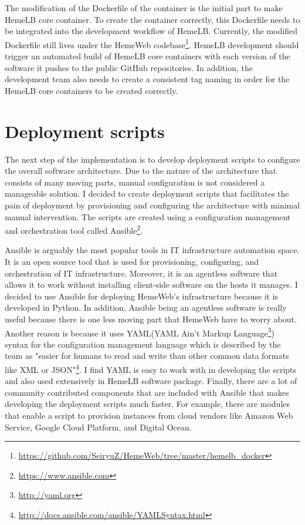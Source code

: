 The modification of the Dockerfile of the container is the initial part to make HemeLB core container. To create the container correctly, this Dockerfile needs to be integrated into the development workflow of HemeLB. Currently, the modified Dockerfile still lives under the HemeWeb codebase\footnote{\url{https://github.com/SeiryuZ/HemeWeb/tree/master/hemelb_docker}}. HemeLB development should trigger an automated build of HemeLB core containers with each version of the software it pushes to the public GitHub repositories. In addition, the development team also needs to create a consistent tag naming in order for the HemeLB core containers to be created correctly.


\section{Deployment scripts}

The next step of the implementation is to develop deployment scripts to configure the overall software architecture. Due to the nature of the architecture that consists of many moving parts, manual configuration is not considered a manageable solution. I decided to create deployment scripts that facilitates the pain of deployment by provisioning and configuring the architecture with minimal manual intervention.  The scripts are created using a configuration management and orchestration tool called Ansible\footnote{\url{https://www.ansible.com}}.

Ansible is arguably the most popular tools in IT infrastructure automation space\citep{mohaan2014learning}. It is an open source tool that is used for provisioning, configuring, and orchestration of IT infrastructure. Moreover, it is an agentless software that allows it to work without installing client-side software on the hosts it manages. I decided to use Ansible for deploying HemeWeb's infrastructure because it is developed in Python\citep{mohaan2014learning}. In addition, Ansible being an agentless software is really useful because there is one less moving part that HemeWeb have to worry about. Another reason is because it uses YAML(YAML Ain't Markup Language\footnote{\url{http://yaml.org}}) syntax for the configuration management language which is described by the team as "easier for humans to read and write than other common data formats like XML or JSON"\footnote{\url{http://docs.ansible.com/ansible/YAMLSyntax.html}}. I find YAML is easy to work with in developing the scripts and also used extensively in HemeLB software package.  Finally, there are a lot of community contributed components that are included with Ansible that makes developing the deployment scripts much faster. For example, there are modules that enable a script to provision instances from cloud vendors like Amazon Web Service, Google Cloud Platform, and Digital Ocean.  




